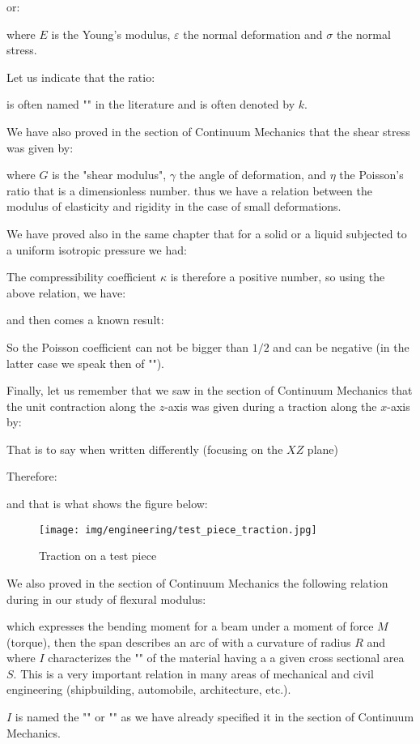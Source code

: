 	or:
	
	where $E$ is the Young's modulus, $\varepsilon$ the normal deformation and $\sigma$ the normal stress. 

	Let us indicate that the ratio:
	
	is often named "" in the literature and is often denoted by $k$.

	We have also proved in the section of Continuum Mechanics that the shear stress was given by:
	
	where $G$ is the "shear modulus", $\gamma$ the angle of deformation, and $\eta$ the Poisson's ratio that is a dimensionless number. thus we have a relation between the modulus of elasticity and rigidity in the case of small deformations.

	We have proved also in the same chapter that for a solid or a liquid subjected to a uniform isotropic pressure we had:
	
	The compressibility coefficient $\kappa$ is therefore  a positive number, so using the above relation, we have:
	
	and then comes a known result:
	
	So the Poisson coefficient can not be bigger than $1/2$ and can be negative (in the latter case we speak then of "").

	Finally, let us remember that we saw in the section of Continuum Mechanics that the unit contraction along the $z$-axis was given during a traction along the $x$-axis by:
	
	That is to say when written differently (focusing on the $XZ$ plane)
	
	Therefore:
	
	and that is what shows the figure below:
	\begin{figure}[H]
		\centering
		\texttt{[image: img/engineering/test\_piece\_traction.jpg]}
		\caption{Traction on a test piece}
	\end{figure}
	We also proved in the section of Continuum Mechanics the following relation during in our study of flexural modulus:
	
	which expresses the bending moment for a beam under a moment of force $M$ (torque), then the span describes an arc of with a curvature of radius $R$ and where $I$ characterizes the "" of the material having a a given cross sectional area $S$. This is a very important relation in many areas of mechanical and civil engineering (shipbuilding, automobile, architecture, etc.).
	\begin{tcolorbox}[title=Remark,colframe=black,arc=10pt]
	$I$ is named the "" or "" as we have already specified it in the section of Continuum Mechanics.
	\end{tcolorbox}
	
